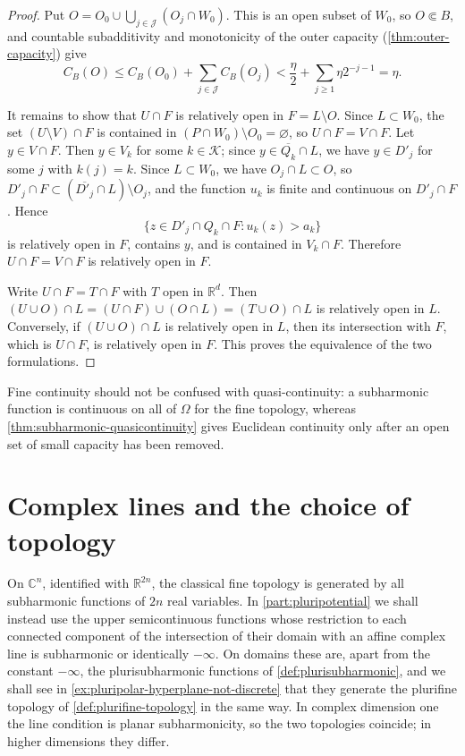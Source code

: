 \begin{proof}
Put $O=O_0\cup\bigcup_{j\in\mathcal J}(O_j\cap W_0)$. This is an open subset of $W_0$, so $O\Subset B$, and countable subadditivity and monotonicity of the outer capacity (\cref{thm:outer-capacity}) give
\[
 C_B(O)\leq C_B(O_0)+\sum_{j\in\mathcal J}C_B(O_j)<\frac\eta2+\sum_{j\geq1}\eta2^{-j-1}=\eta.
\]

It remains to show that $U\cap F$ is relatively open in $F=L\setminus O$. Since $L\subset W_0$, the set $(U\setminus V)\cap F$ is contained in $(P\cap W_0)\setminus O_0=\varnothing$, so $U\cap F=V\cap F$. Let $y\in V\cap F$. Then $y\in V_k$ for some $k\in\mathcal K$; since $y\in\overline{Q_k}\cap L$, we have $y\in D'_j$ for some $j$ with $k(j)=k$. Since $L\subset W_0$, we have $O_j\cap L\subset O$, so $D'_j\cap F\subset(\overline{D'_j}\cap L)\setminus O_j$, and the function $u_k$ is finite and continuous on $D'_j\cap F$. Hence
\[
 \{z\in D'_j\cap Q_k\cap F:u_k(z)>a_k\}
\]
is relatively open in $F$, contains $y$, and is contained in $V_k\cap F$. Therefore $U\cap F=V\cap F$ is relatively open in $F$.

Write $U\cap F=T\cap F$ with $T$ open in $\mathbb R^d$. Then $(U\cup O)\cap L=(U\cap F)\cup(O\cap L)=(T\cup O)\cap L$ is relatively open in $L$. Conversely, if $(U\cup O)\cap L$ is relatively open in $L$, then its intersection with $F$, which is $U\cap F$, is relatively open in $F$. This proves the equivalence of the two formulations.
\end{proof}

Fine continuity should not be confused with quasi-continuity: a subharmonic function is continuous on all of $\Omega$ for the fine topology, whereas \cref{thm:subharmonic-quasicontinuity} gives Euclidean continuity only after an open set of small capacity has been removed.

\section{Complex lines and the choice of topology}
\label{sec:classical-versus-plurifine}
On $\mathbb C^n$, identified with $\mathbb R^{2n}$, the classical fine topology is generated by all subharmonic functions of $2n$ real variables. In \cref{part:pluripotential} we shall instead use the upper semicontinuous functions whose restriction to each connected component of the intersection of their domain with an affine complex line is subharmonic or identically $-\infty$. On domains these are, apart from the constant $-\infty$, the plurisubharmonic functions of \cref{def:plurisubharmonic}, and we shall see in \cref{ex:pluripolar-hyperplane-not-discrete} that they generate the plurifine topology of \cref{def:plurifine-topology} in the same way. In complex dimension one the line condition is planar subharmonicity, so the two topologies coincide; in higher dimensions they differ.

